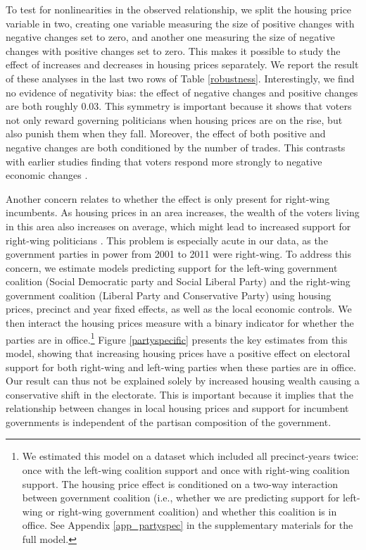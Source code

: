 \documentclass[12pt,a4paper]{article}
\begin{document}
	To test for nonlinearities in the observed relationship, we split the housing price variable in two, creating one variable measuring the size of positive changes with negative changes set to zero, and another one measuring the size of negative changes with positive changes set to zero. This makes it possible to study the effect of increases and decreases in housing prices separately. We report the result of these analyses in the last two rows of Table \ref{robustness}. Interestingly, we find no evidence of negativity bias: the effect of negative changes and positive changes are both roughly 0.03. This symmetry is important because it shows that voters not only reward governing politicians when housing prices are on the rise, but also punish them when they fall. Moreover, the effect of both positive and negative changes are both conditioned by the number of trades.  This contrasts with earlier studies finding that voters respond more strongly to negative economic changes \citep[e.g.][]{bloom1975voter,headrick1991attention,soroka2014negativity}. 
	
	
	Another concern relates to whether the effect is only present for right-wing incumbents. As housing prices in an area increases, the wealth of the voters living in this area also increases on average, which might lead to increased support for right-wing politicians \cite{ansell2014political}. This problem is especially acute in our data, as the government parties in power from 2001 to 2011 were right-wing. To address this concern, we estimate models predicting support for the left-wing government coalition (Social Democratic party and Social Liberal Party) and the right-wing government coalition (Liberal Party and Conservative Party) using housing prices, precinct and year fixed effects, as well as the local economic controls. We then interact the housing prices measure with a binary indicator for whether the parties are in office.\footnote{We estimated this model on a dataset which included all precinct-years twice: once with the left-wing coalition support and once with right-wing coalition support. The housing price effect is conditioned on a two-way interaction between government coalition (i.e., whether we are predicting support for left-wing or right-wing government coalition) and whether this coalition is in office. See Appendix \ref{app_partyspec} in the supplementary materials for the full model.} Figure \ref{partyspecific} presents the key estimates from this model, showing that increasing housing prices have a positive effect on electoral support for both right-wing and left-wing parties when these parties are in office. Our result can thus not be explained solely by increased housing wealth causing a conservative shift in the electorate. This is important because it implies that the relationship between changes in local housing prices and support for incumbent governments is independent of the partisan composition of the government.
	
\end{document}
